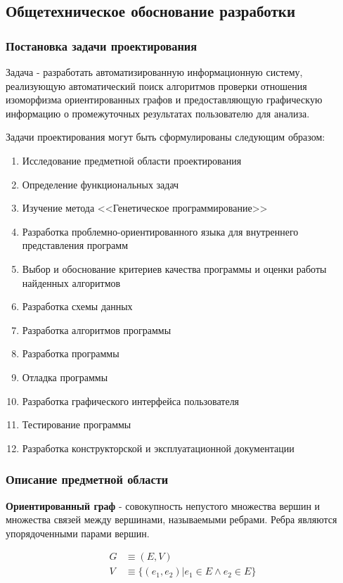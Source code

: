 \documentclass[russian,utf8,emptystyle]{eskdtext}
\begin{document}
\begin{spacing}{1.5}
\subsection{Общетехническое обоснование разработки}
\subsubsection{Постановка задачи проектирования}
Задача - разработать автоматизированную информационную систему, реализующую автоматический поиск алгоритмов проверки отношения изоморфизма ориентированных графов и предоставляющую графическую информацию о промежуточных результатах пользователю для анализа.

Задачи проектирования могут быть сформулированы следующим образом:
\begin{enumerate}
\item Исследование предметной области проектирования
\item Определение функциональных задач
\item Изучение метода <<Генетическое программирование>>
\item Разработка проблемно-ориентированного языка для внутреннего представления программ
\item Выбор и обоснование критериев качества программы и оценки работы найденных алгоритмов
\item Разработка схемы данных
\item Разработка алгоритмов программы
\item Разработка программы
\item Отладка программы
\item Разработка графического интерфейса пользователя
\item Тестирование программы
\item Разработка конструкторской и эксплуатационной документации
\end{enumerate}

\subsubsection{Описание предметной области}
\textbf{Ориентированный граф} - совокупность непустого множества вершин и множества связей между вершинами, называемыми ребрами. Ребра являются упорядоченными парами вершин.

\begin{align*}
G &\equiv ( E, V ) \\ 
V &\equiv \{ (e_1, e_2) | e_1 \in E \wedge e_2 \in E \}
\end{align*}


\end{spacing}
\end{document}
